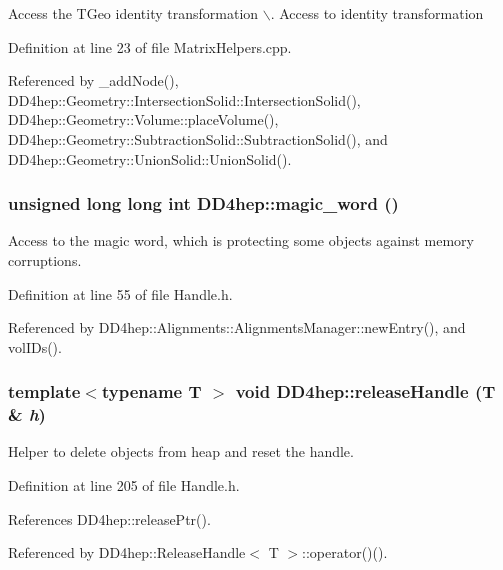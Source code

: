 Access the TGeo identity transformation $\backslash$. Access to identity transformation 

Definition at line 23 of file MatrixHelpers.cpp.

Referenced by \_\-addNode(), DD4hep::Geometry::IntersectionSolid::IntersectionSolid(), DD4hep::Geometry::Volume::placeVolume(), DD4hep::Geometry::SubtractionSolid::SubtractionSolid(), and DD4hep::Geometry::UnionSolid::UnionSolid().\hypertarget{group___d_d4_h_e_p___g_e_o_m_e_t_r_y_ga2410a636084da38b545f3774a04705be}{
\subsubsection[{magic\_\-word}]{\setlength{\rightskip}{0pt plus 5cm}unsigned long long int DD4hep::magic\_\-word ()}}
\label{group___d_d4_h_e_p___g_e_o_m_e_t_r_y_ga2410a636084da38b545f3774a04705be}


Access to the magic word, which is protecting some objects against memory corruptions. 

Definition at line 55 of file Handle.h.

Referenced by DD4hep::Alignments::AlignmentsManager::newEntry(), and volIDs().\hypertarget{group___d_d4_h_e_p___g_e_o_m_e_t_r_y_gab94bee1dd649ac3d00893e4129f2f22a}{
\subsubsection[{releaseHandle}]{\setlength{\rightskip}{0pt plus 5cm}template$<$typename T $>$ void DD4hep::releaseHandle ({\bf T} \& {\em h})}}
\label{group___d_d4_h_e_p___g_e_o_m_e_t_r_y_gab94bee1dd649ac3d00893e4129f2f22a}


Helper to delete objects from heap and reset the handle. 

Definition at line 205 of file Handle.h.

References DD4hep::releasePtr().

Referenced by DD4hep::ReleaseHandle$<$ T $>$::operator()().